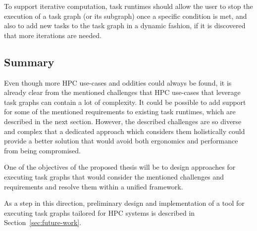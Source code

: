 To support iterative computation, task runtimes should allow the user to stop the execution of a
task graph (or its subgraph) once a specific condition is met, and also to add new tasks to the
task graph in a dynamic fashion, if it is discovered that more iterations are needed.

\subsection{Summary}
Even though more HPC use-cases and oddities could always be found, it is already clear from the
mentioned challenges that HPC use-cases that leverage task graphs can contain a lot of complexity.
It could be possible to add support for some of the mentioned requirements to existing task
runtimes, which are described in the next section. However, the described challenges are so
diverse and complex that a dedicated approach which considers them holistically could provide a
better solution that would avoid both ergonomics and performance from being compromised.

One of the objectives of the proposed thesis will be to design approaches for executing
task graphs that would consider the mentioned challenges and requirements and resolve them
within a unified framework.

As a step in this direction, preliminary design and implementation of a tool for executing task
graphs tailored for HPC systems is described in Section~\ref{sec:future-work}.
